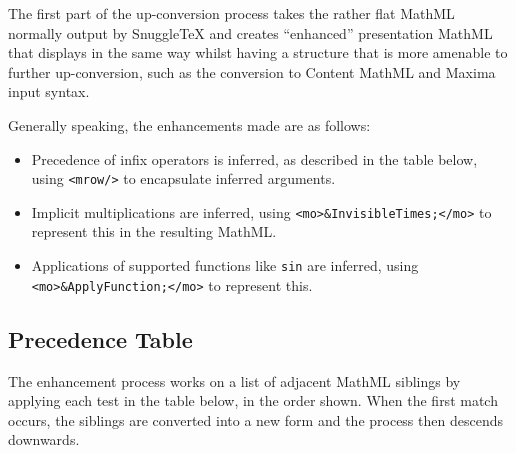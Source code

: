 
\newcommand{\ue}[1]{\upConversionExample{#1}}

The first part of the up-conversion process takes the rather flat MathML normally
output by SnuggleTeX and creates ``enhanced'' presentation MathML that displays in the
same way whilst having a structure that is more amenable to further up-conversion,
such as the conversion to Content MathML and Maxima input syntax.

Generally speaking, the enhancements made are as follows:

\begin{itemize}
\item Precedence of infix operators is inferred, as described in the table 
below, using \verb|<mrow/>| to encapsulate inferred arguments.
\item Implicit multiplications are inferred, using \verb|<mo>&InvisibleTimes;</mo>|
to represent this in the resulting MathML.
\item Applications of supported functions like \verb|sin| are inferred, using
\verb|<mo>&ApplyFunction;</mo>| to represent this.
\end{itemize}

\subsection*{Precedence Table}

The enhancement process works on a list of adjacent MathML siblings by applying
each test in the table below, in the order shown. When the first match occurs,
the siblings are converted into a new form and the process then descends
downwards.


